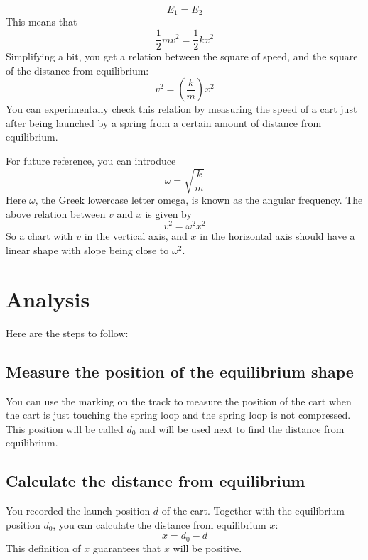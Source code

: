 \begin{equation}
    E_{1} = E_{2}
\end{equation}
This means that
\begin{equation}
    \frac{1}{2} m v^{2} = \frac{1}{2} k x^{2}
\end{equation}
Simplifying a bit, you get a relation between the square of speed, and the square of the distance from equilibrium:
\begin{equation}
    v^{2} = \left( \frac{k}{m} \right) x^{2}
\end{equation}
You can experimentally check this relation by measuring the speed of a cart just after being launched by a spring from a certain amount of distance from equilibrium.

For future reference, you can introduce
\begin{equation}
    \omega = \sqrt{\frac{k}{m}}
\end{equation}
Here $\omega$, the Greek lowercase letter omega, is known as the angular frequency. The above relation between $v$ and $x$ is given by
\begin{equation}
    v^{2} = \omega^{2} x^{2}
\end{equation}
So a chart with $v$ in the vertical axis, and $x$ in the horizontal axis should have a linear shape with slope being close to $\omega^{2}$.
\section{Analysis}
Here are the steps to follow:
\subsection{Measure the position of the equilibrium shape}
You can use the marking on the track to measure the position of the cart when the cart is just touching the spring loop and the spring loop is not compressed. This position will be called $d_{0}$ and will be used next to find the distance from equilibrium.
\subsection{Calculate the distance from equilibrium}
You recorded the launch position $d$ of the cart. Together with the equilibrium position $d_{0}$, you can calculate the distance from equilibrium $x$:
\begin{equation}
    x = d_{0} - d
\end{equation}
This definition of $x$ guarantees that $x$ will be positive.
